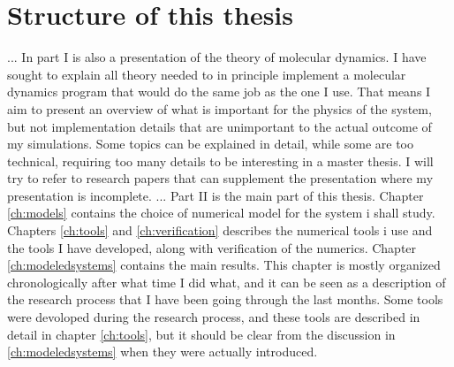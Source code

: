 \section{Structure of this thesis}
...
In part I is also a presentation of the theory of molecular dynamics. I have sought to explain all theory needed to in principle implement a molecular dynamics program that would do the same job as the one I use. That means I aim to present an overview of what is important for the physics of the system, but not implementation details that are unimportant to the actual outcome of my simulations. Some topics can be explained in detail, while some are too technical, requiring too many details to be interesting in a master thesis. I will try to refer to research papers that can supplement the presentation where my presentation is incomplete.
...
Part II is the main part of this thesis. Chapter \ref{ch:models} contains the choice of numerical model for the system i shall study. Chapters \ref{ch:tools} and \ref{ch:verification} describes the numerical tools i use and the tools I have developed, along with verification of the numerics. Chapter \ref{ch:modeledsystems} contains the main results. This chapter is mostly organized chronologically after what time I did what, and it can be seen as a description of the research process that I have been going through the last months. Some tools were devoloped during the research process, and these tools are described in detail in chapter \ref{ch:tools}, but it should be clear from the discussion in \ref{ch:modeledsystems} when they were actually introduced.


